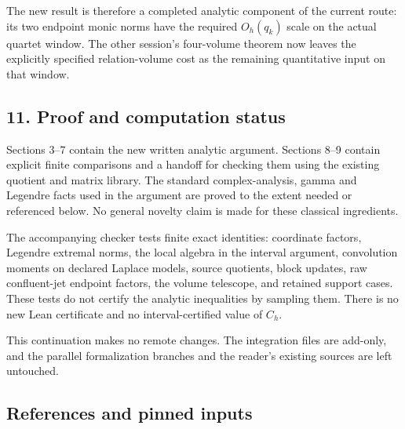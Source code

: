 The new result is therefore a completed analytic component of the
current route: its two endpoint monic norms have the required
\(O_h(q_k)\) scale on the actual quartet window. The other session's
four-volume theorem now leaves the explicitly specified relation-volume
cost as the remaining quantitative input on that window.

\subsection*{11. Proof and computation
status}
\label{AE.proof-and-computation-status}

Sections 3--7 contain the new written analytic argument. Sections 8--9
contain explicit finite comparisons and a handoff for checking them
using the existing quotient and matrix library. The standard
complex-analysis, gamma and Legendre facts used in the argument are
proved to the extent needed or referenced below. No general novelty
claim is made for these classical ingredients.

The accompanying checker tests finite exact identities: coordinate
factors, Legendre extremal norms, the local algebra in the interval
argument, convolution moments on declared Laplace models, source
quotients, block updates, raw confluent-jet endpoint factors, the volume
telescope, and retained support cases. These tests do not certify the
analytic inequalities by sampling them. There is no new Lean certificate
and no interval-certified value of \(C_h\).

This continuation makes no remote changes. The integration files are
add-only, and the parallel formalization branches and the reader's
existing sources are left untouched.

\subsection*{References and pinned
inputs}
\label{AE.references-and-pinned-inputs}

